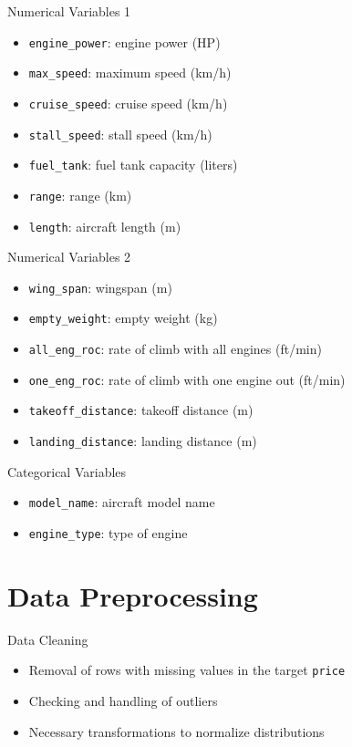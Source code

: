 \documentclass{beamer}
\begin{document}
\begin{frame}{Numerical Variables 1}
    \begin{itemize}
        \item \texttt{engine\_power}: engine power (HP)
        \item \texttt{max\_speed}: maximum speed (km/h)
        \item \texttt{cruise\_speed}: cruise speed (km/h)
        \item \texttt{stall\_speed}: stall speed (km/h)
        \item \texttt{fuel\_tank}: fuel tank capacity (liters)
        \item \texttt{range}: range (km)
        \item \texttt{length}: aircraft length (m)
    \end{itemize}
\end{frame}

\begin{frame}{Numerical Variables 2}
    \begin{itemize}
        \item \texttt{wing\_span}: wingspan (m)
        \item \texttt{empty\_weight}: empty weight (kg)
        \item \texttt{all\_eng\_roc}: rate of climb with all engines (ft/min)
        \item \texttt{one\_eng\_roc}: rate of climb with one engine out (ft/min)
        \item \texttt{takeoff\_distance}: takeoff distance (m)
        \item \texttt{landing\_distance}: landing distance (m)
    \end{itemize}
\end{frame}

\begin{frame}{Categorical Variables}
    \begin{itemize}
        \item \texttt{model\_name}: aircraft model name
        \item \texttt{engine\_type}: type of engine
    \end{itemize}
\end{frame}

\section{Data Preprocessing}
\begin{frame}{Data Cleaning}
  \begin{itemize}
    \item Removal of rows with missing values in the target \texttt{price}
    \item Checking and handling of outliers
    \item Necessary transformations to normalize distributions
  \end{itemize}
\end{frame}
\end{document}
